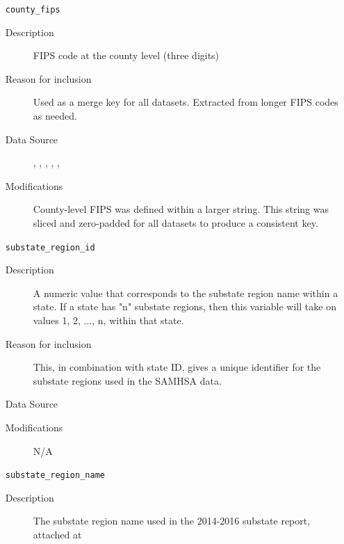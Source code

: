 \documentclass{article}
\begin{document}
\begin{itemize}[label={}, align=left]
    \item[\texttt{county\_fips}] \
          \begin{description}
              \item[Description] FIPS code at the county level (three digits)
              \item[Reason for inclusion] Used as a merge key for all datasets.
                    Extracted from longer FIPS codes as needed. \\
              \item[Data Source]
                    \cite{acs_demographics_data},
                    \cite{acs_poverty_data},
                    \cite{acs_income_data},
                    \cite{acs_marital_data},
                    \cite{acs_education_data},
                    \cite{samhsa_data} \\
              \item[Modifications] County-level FIPS was defined within a
                    larger string. This string was sliced and zero-padded for all
                    datasets to produce a consistent key. \\
          \end{description}
    \item[\texttt{substate\_region\_id}] \
          \begin{description}
              \item[Description] A numeric value that corresponds to the
                    substate region name within a state. If a state has "n"
                    substate regions, then this variable will take on values 1,
                    2, ..., n, within that state.
              \item[Reason for inclusion] This, in combination with state ID,
                    gives a unique identifier for the substate regions used in the
                    SAMHSA data.
              \item[Data Source] \cite{samhsa_substate_region_defs}
              \item[Modifications] N/A
          \end{description}
    \item[\texttt{substate\_region\_name}] \
          \begin{description}
              \item[Description] The substate region name used in the 2014-2016
                    substate report, attached at


\end{description}
\end{itemize}
\end{document}
